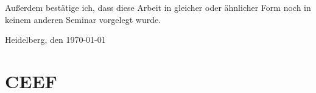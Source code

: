 \documentclass[
     11pt,         %
     a4paper,      %
     oneside,
     ]{article}
\begin{document}
Außerdem bestätige ich, dass diese Arbeit in gleicher oder ähnlicher Form noch in keinem anderen Seminar vorgelegt wurde.
\vspace*{50pt}

Heidelberg, den \today \hspace{2cm} \underline{\phantom{Platz für die Unterschrift}}
\newpage



\tableofcontents
\newpage










\section{CEEF}






\newpage

\end{document}
